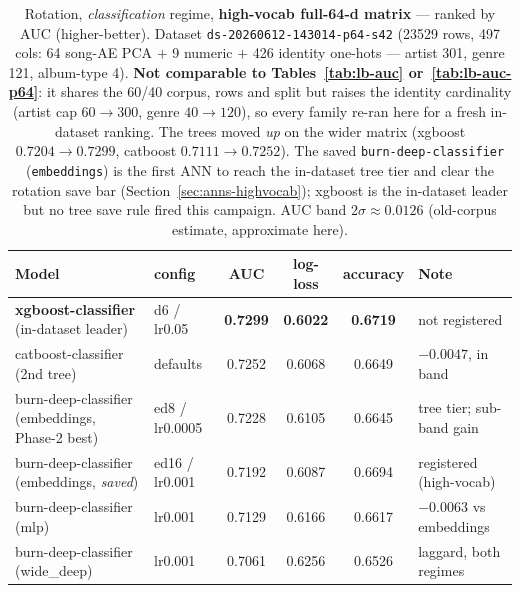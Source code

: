 \documentclass[11pt]{article}
\newcommand{\dsid}[1]{\texttt{\small #1}}
\newcommand{\best}[1]{\textbf{#1}}
\begin{document}
\begin{table}[ht]
  \centering
  \caption{Rotation, \emph{classification} regime, \textbf{high-vocab full-64-d
  matrix} --- ranked by AUC (higher-better). Dataset
  \dsid{ds-20260612-143014-p64-s42} (\num{23529} rows, 497 cols: 64 song-AE
  PCA $+$ 9 numeric $+$ 426 identity one-hots --- artist 301, genre 121,
  album-type 4). \textbf{Not comparable to Tables~\ref{tab:lb-auc}
  or~\ref{tab:lb-auc-p64}}: it shares the 60/40 corpus, rows and split but
  raises the identity cardinality (artist cap $60\to300$, genre $40\to120$), so
  every family re-ran here for a fresh in-dataset ranking. The trees moved
  \emph{up} on the wider matrix (xgboost $0.7204\to\num{0.7299}$, catboost
  $0.7111\to\num{0.7252}$). The saved \texttt{burn-deep-classifier}
  (\texttt{embeddings}) is the first ANN to reach the in-dataset tree tier and
  clear the rotation save bar (Section~\ref{sec:anns-highvocab}); xgboost is the
  in-dataset leader but no tree save rule fired this campaign. AUC band
  $2\sigma\approx 0.0126$ (old-corpus estimate, approximate here).}
  \label{tab:lb-auc-highvocab}
  \begin{tabular}{llcccl}
    \toprule
    Model & config & AUC & log-loss & accuracy & Note \\
    \midrule
    \best{xgboost-classifier} (in-dataset leader)     & d6 / lr0.05      & \best{0.7299} & \best{0.6022} & \best{0.6719} & not registered \\
    catboost-classifier (2nd tree)                    & defaults         & 0.7252 & 0.6068 & 0.6649 & $-0.0047$, in band \\
    burn-deep-classifier (embeddings, Phase-2 best)   & ed8 / lr0.0005   & 0.7228 & 0.6105 & 0.6645 & tree tier; sub-band gain \\
    burn-deep-classifier (embeddings, \emph{saved})   & ed16 / lr0.001   & 0.7192 & 0.6087 & 0.6694 & registered (high-vocab) \\
    burn-deep-classifier (mlp)                        & lr0.001          & 0.7129 & 0.6166 & 0.6617 & $-0.0063$ vs embeddings \\
    burn-deep-classifier (wide\_deep)                 & lr0.001          & 0.7061 & 0.6256 & 0.6526 & laggard, both regimes \\
    \bottomrule
  \end{tabular}
\end{table}
\end{document}
